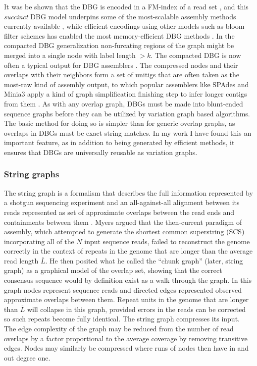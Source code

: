 It was be shown that the DBG is encoded in a FM-index of a read set \cite{bowe2012succinct}, and this \emph{succinct} DBG model underpins some of the most-scalable assembly methods currently available \cite{li2015megahit}, while efficient encodings using other models such as bloom filter schemes has enabled the most memory-efficient DBG methods \cite{chikhi2012space}.
In the compacted DBG generalization non-furcating regions of the graph might be merged into a single node with label length $>k$.
The compacted DBG is now often a typical output for DBG assemblers \cite{chikhi2016compacting,minkin2016twopaco}.
The compressed nodes and their overlaps with their neighbors form a set of unitigs that are often taken as the most-raw kind of assembly output, to which popular assemblers like SPAdes and Minia3 apply a kind of graph simplification finishing step to infer longer contigs from them \cite{bankevich2012spades}.
As with any overlap graph, DBGs must be made into blunt-ended sequence graphs before they can be utilized by variation graph based algorithms.
The basic method for doing so is simpler than for generic overlap graphs, as overlaps in DBGs must be exact string matches.
In my work I have found this an important feature, as in addition to being generated by efficient methods, it ensures that DBGs are universally reusable as variation graphs.

\subsubsection{String graphs}
\label{sec:string_graphs}

The string graph is a formalism that describes the full information represented by a shotgun sequencing experiment and an all-against-all alignment between its reads represented as set of approximate overlaps between the read ends and containments between them \cite{myers1995toward,myers2005}.
Myers argued that the then-current paradigm of assembly, which attempted to generate the shortest common superstring (SCS) incorporating all of the $N$ input sequence reads, failed to reconstruct the genome correctly in the context of repeats in the genome that are longer than the average read length $\overline{L}$.
He then posited what he called the ``chunk graph'' (later, string graph) as a graphical model of the overlap set, showing that the correct consensus sequence would by definition exist as a walk through the graph.
In this graph nodes represent sequence reads and directed edges represented observed approximate overlaps between them.
Repeat units in the genome that are longer than $\overline{L}$ will collapse in this graph, provided errors in the reads can be corrected so such repeats become fully identical.
The string graph compresses its input.
The edge complexity of the graph may be reduced from the number of read overlaps by a factor proportional to the average coverage by removing transitive edges.
Nodes may similarly be compressed where runs of nodes then have in and out degree one.

